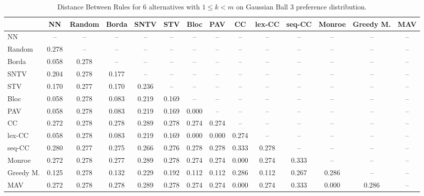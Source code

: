 
\begin{table*}
\centering
\begin{tabular}{lccccccccccccc}
\toprule
 & NN & Random & Borda & SNTV & STV & Bloc & PAV & CC & lex-CC & seq-CC & Monroe & Greedy M. & MAV \\
\midrule
NN & -- & -- & -- & -- & -- & -- & -- & -- & -- & -- & -- & -- & -- \\
Random & 0.278 & -- & -- & -- & -- & -- & -- & -- & -- & -- & -- & -- & -- \\
Borda & 0.058 & 0.278 & -- & -- & -- & -- & -- & -- & -- & -- & -- & -- & -- \\
SNTV & 0.204 & 0.278 & 0.177 & -- & -- & -- & -- & -- & -- & -- & -- & -- & -- \\
STV & 0.170 & 0.277 & 0.170 & 0.236 & -- & -- & -- & -- & -- & -- & -- & -- & -- \\
Bloc & 0.058 & 0.278 & 0.083 & 0.219 & 0.169 & -- & -- & -- & -- & -- & -- & -- & -- \\
PAV & 0.058 & 0.278 & 0.083 & 0.219 & 0.169 & 0.000 & -- & -- & -- & -- & -- & -- & -- \\
CC & 0.272 & 0.278 & 0.278 & 0.289 & 0.278 & 0.274 & 0.274 & -- & -- & -- & -- & -- & -- \\
lex-CC & 0.058 & 0.278 & 0.083 & 0.219 & 0.169 & 0.000 & 0.000 & 0.274 & -- & -- & -- & -- & -- \\
seq-CC & 0.280 & 0.277 & 0.275 & 0.266 & 0.276 & 0.278 & 0.278 & 0.333 & 0.278 & -- & -- & -- & -- \\
Monroe & 0.272 & 0.278 & 0.277 & 0.289 & 0.278 & 0.274 & 0.274 & 0.000 & 0.274 & 0.333 & -- & -- & -- \\
Greedy M. & 0.125 & 0.278 & 0.132 & 0.229 & 0.192 & 0.112 & 0.112 & 0.286 & 0.112 & 0.267 & 0.286 & -- & -- \\
MAV & 0.272 & 0.278 & 0.278 & 0.289 & 0.278 & 0.274 & 0.274 & 0.000 & 0.274 & 0.333 & 0.000 & 0.286 & -- \\
\bottomrule
\end{tabular}

\caption{Distance Between Rules for 6 alternatives with $1 \leq k < m$ on Gaussian Ball 3 preference distribution.}
\end{table*}
